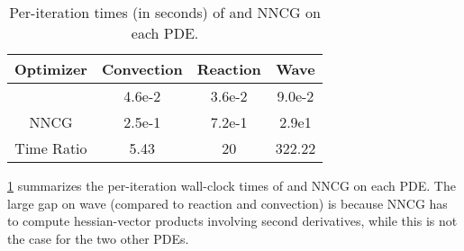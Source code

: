 \begin{table}[t]
    \caption{Per-iteration times (in seconds) of \lbfgs{} and NNCG on each PDE.}
    \vskip 0.15in
    \centering
    \begin{tabular}{|c|c|c|c|}
        \hline
        Optimizer & Convection & Reaction & Wave \\
        \hline
        \lbfgs{} & 4.6e-2 & 3.6e-2 & 9.0e-2 \\
        \hline
        NNCG & 2.5e-1 & 7.2e-1 & 2.9e1 \\
        \hline
        Time Ratio & 5.43 & 20 & 322.22 \\
        \hline
    \end{tabular}
    \label{tab:wall_clock_time_comparison}
\end{table}

\cref{tab:wall_clock_time_comparison} summarizes the per-iteration wall-clock times of \lbfgs{} and NNCG on each PDE. The large gap on wave (compared to reaction and convection) is because NNCG has to compute hessian-vector products involving second derivatives, while this is not the case for the two other PDEs. 


